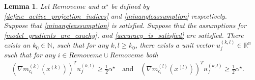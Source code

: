 \documentclass{article}
\newtheorem{lemma}[theorem]{Lemma}
\theoremstyle{case}
\numberwithin{theorem}{subsection}
\newcommand{\gmcik}{{\nabla m_{c_i}^{(k)}\left(\xk\right)}}
\newcommand{\gmcil}{{\nabla m_{c_i}^{(l)}\left(\xl\right)}}
\newcommand{\minanglealpha}{{ \alpha^{\star} }}
\newcommand{\naturals}{\mathbb N}
\newcommand{\Rn}{\mathbb R^n}
\newcommand{\xk}{x^{(k)}}
\newcommand{\xl}{{x^{(l)}}}
\newcommand{\activeprojk}{{Remove me}}
\newcommand{\activeprojl}{{Remove me}}
\begin{document}
\begin{lemma}
\label{here_she_is}
Let $\activeprojk$ and $\minanglealpha$ be defined by \cref{define_active_projection_indices} and \cref{minangleassumption} respectively.
Suppose that \cref{minangleassumption} is satisfied.
Suppose that the assumptions for \cref{model_gradients_are_cauchy}, and \cref{accuracy_is_satisfied} are satisfied.
There exists an $k_0 \in \naturals$, such that for any $k, l \ge k_0$, there exists a unit vector $u_f^{(k,l)} \in \Rn$ such that for any 
$i \in \activeprojk \cup \activeprojl$
both 
\begin{align*}
\left(\gmcik\right)^T u_f^{(k,l)} \ge \frac 1 2 \minanglealpha
\quad \textrm{and} \quad
\left(\gmcil\right)^T u_f^{(k,l)} \ge \frac 1 2 \minanglealpha.
\end{align*}
\end{lemma}
\end{document}
